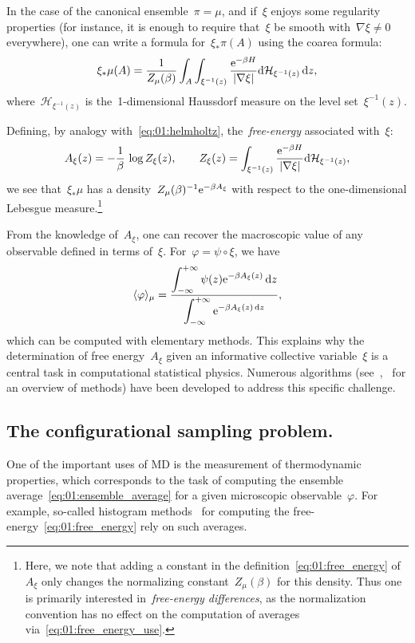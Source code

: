 In the case of the canonical ensemble~$\pi = \mu$, and if~$\xi$ enjoys some regularity properties (for instance, it is enough to require that~$\xi$ be smooth with~$\nabla\xi\neq 0$ everywhere), one can write a formula for~$\xi_*\pi(A)$ using the coarea formula:
\begin{equation}
    \xi_*\mu(A) = \frac1{Z_\mu(\beta)}\int_A\int_{\xi^{-1}(z)}\frac{\mathrm{e}^{-\beta H}}{|\nabla \xi|}\mathrm{d} \mathcal H_{\xi^{-1}(z)}\,\mathrm{d} z,
\end{equation}
where~$\mathcal H_{\xi^{-1}(z)}$ is the~1-dimensional Haussdorf measure on the level set~$\xi^{-1}(z)$.

Defining, by analogy with~\eqref{eq:01:helmholtz}, the~\textit{free-energy} associated with~$\xi$:
\begin{equation}
    \label{eq:01:free_energy}
    A_\xi(z) = -\frac1\beta\,\log Z_\xi(z),\qquad Z_\xi(z) = \int_{\xi^{-1}(z)}\frac{\mathrm{e}^{-\beta H}}{|\nabla \xi|}\mathrm{d} \mathcal H_{\xi^{-1}(z)},
\end{equation}
we see that~$\xi_*\mu$ has a density~$Z_\mu(\beta)^{-1} \mathrm{e}^{-\beta A_\xi}$ with respect to the one-dimensional Lebesgue measure.\footnote{Here, we note that adding a constant in the definition~\eqref{eq:01:free_energy} of~$A_\xi$ only changes the normalizing constant~$Z_\mu(\beta)$ for this density. Thus one is primarily interested in~\textit{free-energy differences}, as the normalization convention has no effect on the computation of averages via~\eqref{eq:01:free_energy_use}.}

From the knowledge of~$A_\xi$, one can recover the macroscopic value of any observable defined in terms of~$\xi$. For~$\varphi = \psi\circ\xi$, we have
\begin{equation}
\label{eq:01:free_energy_use}
\langle \varphi\rangle_{\mu} = \frac{\displaystyle\int_{-\infty}^{+\infty} \psi(z) \mathrm{e}^{-\beta A_\xi(z)}\,\mathrm{d} z}{ \displaystyle\int_{-\infty}^{+\infty} \mathrm{e}^{-\beta A_\xi(z)\,\mathrm{d} z}},
\end{equation}
which can be computed with elementary methods. This explains why the determination of free energy~$A_\xi$ given an informative collective variable~$\xi$ is a central task in computational statistical physics. Numerous algorithms (see~\cite{LRS10,LRS12},~\cite[Section 4]{LS16} for an overview of methods) have been developed to address this specific challenge.

\subsection{The configurational sampling problem.}
\label{subsec:01:sampling}
One of the important uses of MD is the measurement of thermodynamic properties, which corresponds to the task of computing the ensemble average~\eqref{eq:01:ensemble_average} for a given microscopic observable~$\varphi$.
For example, so-called histogram methods~\cite[Section 2.5]{LRS10} for computing the free-energy~\eqref{eq:01:free_energy} rely on such averages.

